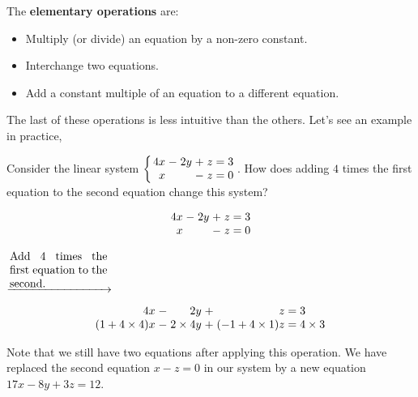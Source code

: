 \begin{definition}The \textbf{elementary operations} are:
	\begin{itemize}
		\item Multiply (or divide) an equation by a non-zero constant.
		\item Interchange two equations.
		\item Add a constant multiple of an equation to a different equation.
	\end{itemize}
\end{definition}

The last of these operations is less intuitive than the others. Let's see an example in practice,

\begin{example}
	Consider the linear system $\left\{
			\arraycolsep=1.4pt
			\begin{array}{rcrcrl}
				4x &-& 2y &+& z &= 3\\
						x &&&-& z &= 0
		\end{array}\right.$. How does adding $4$ times the first equation to the second equation change this system?
		
		\begin{center}
			\begin{minipage}{0.2\textwidth}
				\[
				\arraycolsep=1.4pt
				\begin{array}{rcrcrl}
					4x &-& 2y &+& z &= 3\\
					x &&&-& z &= 0
				\end{array}
				\]
			\end{minipage}
			$\xrightarrow{
				\begin{minipage}{0.25\textwidth}
					Add $4$ times the first equation to the second.
				\end{minipage}
				}$
			\begin{minipage}{0.5\textwidth}
				\[
				\arraycolsep=1.4pt
				\begin{array}{rcrcrl}
					4x &-& 2y &+& z &= 3\\
					(1 + 4\times 4)x &- & 2\times 4y&+& (-1 + 4\times 1)z &= 4\times 3
				\end{array}
				\]		
			\end{minipage}
		\end{center}
		
		Note that we still have two equations after applying this operation. We have replaced the second equation $x-z = 0$ in our system by a new equation $17x - 8y +3z = 12$.
\end{example}

